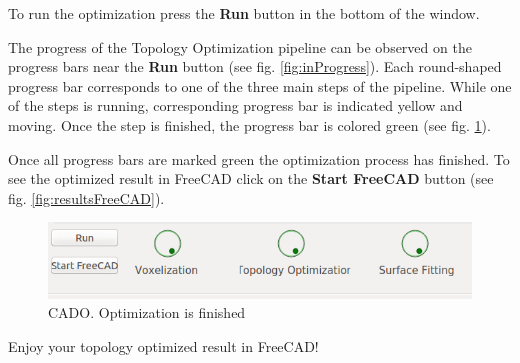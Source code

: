 \documentclass[
12pt, %
a4paper, %
oneside, %
headinclude,footinclude, %
BCOR5mm, %
]{scrartcl}
\begin{document}
To run the optimization press the \textbf{Run} button in the bottom of the window.

The progress of the Topology Optimization pipeline can be observed on the progress bars near the \textbf{Run} button (see fig. \ref{fig:inProgress}). Each round-shaped progress bar corresponds to one of the three main steps of the pipeline. While one of the steps is running, corresponding progress bar is indicated yellow and moving. Once the step is finished, the progress bar is colored green (see fig. \ref{fig:progressBarsFinished}).


Once all progress bars are marked green the optimization process has finished. To see the optimized result in FreeCAD click on the \textbf{Start FreeCAD} button (see fig. \ref{fig:resultsFreeCAD}).
\begin{figure}
\centering
\includegraphics[scale=0.4]{Pictures/progressBar_ready.png}
\caption{CADO. Optimization is finished}
\label{fig:progressBarsFinished}
\end{figure}

Enjoy your topology optimized result in FreeCAD!
\end{document}
